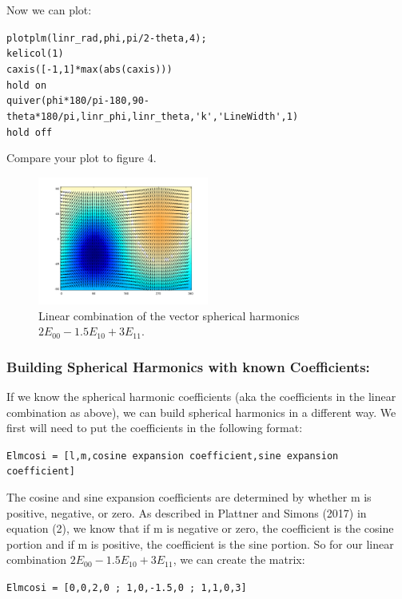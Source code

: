 \documentclass[11pt]{article}
\begin{document}
Now we can plot:

\verb|plotplm(linr_rad,phi,pi/2-theta,4);|\\
\verb|kelicol(1)|\\
\verb|caxis([-1,1]*max(abs(caxis)))|\\
\verb|hold on|\\
\verb|quiver(phi*180/pi-180,90-theta*180/pi,linr_phi,linr_theta,'k','LineWidth',1)|\\
\verb|hold off|

Compare your plot to figure 4.

\begin{figure}[H]
  \centering
  \includegraphics[width=0.5\textwidth]{figures_Rep2/lincomb1.png}  
  \caption{Linear combination of the vector spherical harmonics $2E_{00}-1.5E_{10}+3E_{11}$.}
\label{E_comb}
\end{figure}

\subsubsection{Building Spherical Harmonics with known Coefficients:}

If we know the spherical harmonic coefficients (aka the coefficients in the linear combination as above), we can build spherical harmonics in a different way. We first will need to put the coefficients in the following format:

\verb|Elmcosi = [l,m,cosine expansion coefficient,sine expansion coefficient]|

The cosine and sine expansion coefficients are determined by whether m is positive, negative, or zero.  As described in Plattner and Simons (2017) in equation (2), we know that if m is negative or zero, the coefficient is the cosine portion and if m is positive, the coefficient is the sine portion.  So for our linear combination $2E_{00}-1.5E_{10}+3E_{11}$, we can create the matrix:

\verb|Elmcosi = [0,0,2,0 ; 1,0,-1.5,0 ; 1,1,0,3]|
\end{document}
